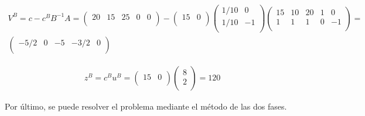 \begin{enumerate}
\begin{equation}
\begin{split}
V^B = c-c^BB^{-1}A = \begin{pmatrix}
20 & 15 & 25 & 0 & 0\\
\end{pmatrix}
 - \begin{pmatrix}
15 & 0\\
\end{pmatrix}
\begin{pmatrix}
1/10 & 0\\
1/10 & -1\\
\end{pmatrix}
\begin{pmatrix}
15 & 10 & 20 & 1 & 0\\
1 & 1 & 1 & 0 & -1\\
\end{pmatrix}
 = \\
 \begin{pmatrix}
-5/2 & 0 & -5 & -3/2 & 0\\
\end{pmatrix}
\end{split}
\end{equation}

\begin{equation}
\begin{split}
z^B=c^Bu^B = \begin{pmatrix}
15 & 0\\
\end{pmatrix}
\begin{pmatrix}
8\\
2\\
\end{pmatrix}
 = 120\end{split}
\end{equation}

    
    Por último, se puede resolver el problema mediante el método de las dos fases.


\end{enumerate}
